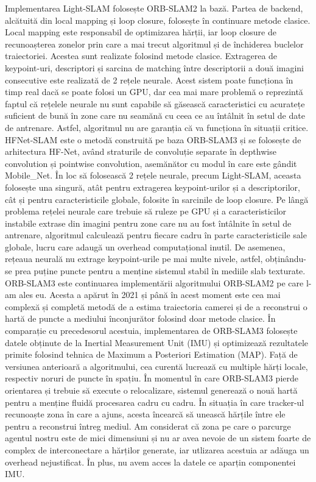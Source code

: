 \documentclass[12pt,a4paper]{report}
\begin{document}
Implementarea Light-SLAM folosește ORB-SLAM2 la bază. Partea de backend,
alcătuită din local mapping și loop closure, folosește în continuare metode clasice. Local mapping
este responsabil de optimizarea hărții, iar loop closure de recunoașterea
zonelor prin care a mai trecut algoritmul și de închiderea buclelor traiectoriei. Acestea sunt 
realizate folosind metode clasice. Extragerea de keypoint-uri, descriptori și sarcina de 
matching între descriptorii a două imagini consecutive este realizată de 2 rețele neurale.
Acest sistem poate funcționa în timp real dacă se poate folosi un GPU, dar cea mai mare 
problemă o reprezintă faptul că rețelele neurale nu sunt capabile să găsească caracteristici cu
acuratețe suficient de bună în zone care nu seamănă cu ceea ce au întâlnit în setul de date
de antrenare. Astfel, algoritmul nu are garanția că va funcționa în situații critice.\\

HFNet-SLAM este o metodă construită pe baza ORB-SLAM3 și se folosește de arhitectura HF-Net, 
având straturile de convoluție separate în depthwise convolution și pointwise convolution, 
asemănător cu modul în care este gândit Mobile\_Net. În loc să folosească 2 rețele neurale, 
precum Light-SLAM, aceasta folosește una singură, atât pentru extragerea keypoint-urilor și a
descriptorilor, cât și pentru caracteristicile globale, folosite în sarcinile de loop closure. 
Pe lângă problema rețelei neurale care trebuie să ruleze pe GPU și a caracteristicilor instabile 
extrase din imagini pentru zone care nu au fost întâlnite în setul de antrenare, algoritmul
calculează pentru fiecare cadru în parte caracteristicile sale globale, lucru care adaugă un 
overhead computațional inutil. De asemenea, rețeaua neurală nu extrage keypoint-urile
pe mai multe nivele, astfel, obținându-se prea puține puncte pentru a menține sistemul stabil 
în mediile slab texturate. \\

ORB-SLAM3 este continuarea implementării algoritmului ORB-SLAM2 pe care l-am ales eu.
Acesta a apărut în 2021 și până în acest moment este cea mai complexă și completă metodă de a
estima traiectoria camerei și de a reconstrui o hartă de puncte a mediului înconjurător folosind 
doar metode clasice. În comparație cu precedesorul acestuia, implementarea de ORB-SLAM3 folosește
datele obținute de la Inertial Measurement Unit (IMU) și optimizează rezultatele primite 
folosind tehnica de Maximum a Posteriori Estimation (MAP). Față de versiunea anterioară a algoritmului, cea
curentă lucrează cu multiple hărți locale, respectiv noruri
de puncte în spațiu. În momentul în care ORB-SLAM3 pierde orientarea și trebuie să execute 
o relocalizare, sistemul generează o nouă hartă pentru a menține fluidă procesarea cadru 
cu cadru. În situația în care tracker-ul recunoaște zona în care a ajuns, acesta încearcă să unească 
hărțile între ele pentru a reconstrui întreg mediul. Am considerat că zona pe care o parcurge 
agentul nostru este de mici dimensiuni și nu ar avea nevoie de un sistem foarte de 
complex de interconectare a hărților generate, iar utlizarea acestuia ar adăuga un overhead
nejustificat. În plus, nu avem acces la datele ce aparțin componentei IMU.\@ \\
\end{document}
